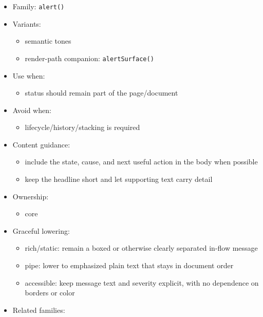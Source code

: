 \begin{itemize}
\tightlist
\item
  Family: \texttt{a\allowbreak{}l\allowbreak{}e\allowbreak{}r\allowbreak{}t\allowbreak{}(\allowbreak{})}
\item
  Variants:

  \begin{itemize}
  \tightlist
  \item
    semantic tones
  \item
    render-path companion: \texttt{a\allowbreak{}l\allowbreak{}e\allowbreak{}r\allowbreak{}t\allowbreak{}S\allowbreak{}u\allowbreak{}r\allowbreak{}f\allowbreak{}a\allowbreak{}c\allowbreak{}e\allowbreak{}(\allowbreak{})}
  \end{itemize}
\item
  Use when:

  \begin{itemize}
  \tightlist
  \item
    status should remain part of the page/document
  \end{itemize}
\item
  Avoid when:

  \begin{itemize}
  \tightlist
  \item
    lifecycle/history/stacking is required
  \end{itemize}
\item
  Content guidance:

  \begin{itemize}
  \tightlist
  \item
    include the state, cause, and next useful action in the body when possible
  \item
    keep the headline short and let supporting text carry detail
  \end{itemize}
\item
  Ownership:

  \begin{itemize}
  \tightlist
  \item
    core
  \end{itemize}
\item
  Graceful lowering:

  \begin{itemize}
  \tightlist
  \item
    rich/static: remain a boxed or otherwise clearly separated in-flow message
  \item
    pipe: lower to emphasized plain text that stays in document order
  \item
    accessible: keep message text and severity explicit, with no dependence on borders or color
  \end{itemize}
\item
  Related families:


\end{itemize}
